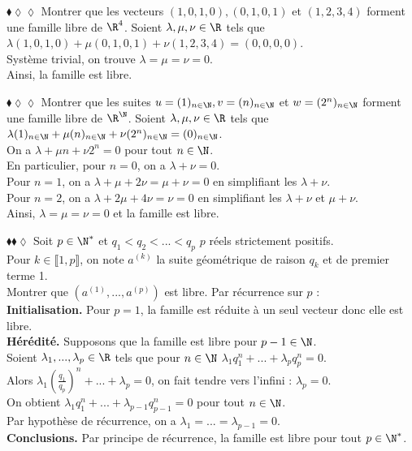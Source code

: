 \documentclass[11pt]{article}
\begin{document}
\begin{exercice}{$\blacklozenge\lozenge\lozenge$}{}
    Montrer que les vecteurs $(1, 0, 1, 0), (0, 1, 0, 1)$ et $(1, 2, 3, 4)$ forment une famille libre de $\R^4$.
    \tcblower
    Soient $\lambda, \mu, \nu \in \R$ tels que $\lambda(1, 0, 1, 0) + \mu(0, 1, 0, 1) + \nu(1, 2, 3, 4) = (0, 0, 0, 0)$.\\
    Système trivial, on trouve $\lambda = \mu = \nu = 0$.\\
    Ainsi, la famille est libre.
\end{exercice}

\begin{exercice}{$\blacklozenge\lozenge\lozenge$}{}
    Montrer que les suites $u=(1)_{n\in\N}, v=(n)_{n\in\N}$ et $w=(2^n)_{n\in\N}$ forment une famille libre de $\R^\N$.
    \tcblower
    Soient $\lambda, \mu, \nu \in \R$ tels que $\lambda(1)_{n\in\N} + \mu(n)_{n\in\N} + \nu(2^n)_{n\in\N} = (0)_{n\in\N}$.\\
    On a $\lambda + \mu n + \nu 2^n = 0$ pour tout $n \in \N$.\\
    En particulier, pour $n = 0$, on a $\lambda + \nu = 0$.\\
    Pour $n = 1$, on a $\lambda + \mu + 2\nu = \mu + \nu = 0$ en simplifiant les $\lambda + \nu$.\\
    Pour $n = 2$, on a $\lambda + 2\mu + 4\nu = \nu = 0$ en simplifiant les $\lambda + \nu$ et $\mu + \nu$.\\
    Ainsi, $\lambda = \mu = \nu = 0$ et la famille est libre.
\end{exercice}

\begin{exercice}{$\blacklozenge\blacklozenge\lozenge$}{}
    Soit $p\in\N^*$ et $q_1<q_2<...<q_p$ $p$ réels strictement positifs.\\
    Pour $k \in \llbracket 1, p \rrbracket$, on note $a^{(k)}$ la suite géométrique de raison $q_k$ et de premier terme 1.\\
    Montrer que $(a^{(1)}, ..., a^{(p)})$ est libre.
    \tcblower
    Par récurrence sur $p$ :\\
    \textbf{Initialisation.} Pour $p = 1$, la famille est réduite à un seul vecteur donc elle est libre.\\
    \textbf{Hérédité.} Supposons que la famille est libre pour $p-1 \in \N$.\\
    Soient $\lambda_1, ..., \lambda_{p} \in \R$ tels que pour $n\in\N$ $\lambda_1q_1^n + ... + \lambda_{p}q_{p}^n = 0$.\\
    Alors $\lambda_1\left(\frac{q_1}{q_{p}}\right)^n + ... + \lambda_p = 0$, on fait tendre vers l'infini : $\lambda_p = 0$.\\
    On obtient $\lambda_1q_1^n + ... + \lambda_{p-1}q_{p-1}^n = 0$ pour tout $n\in\N$.\\
    Par hypothèse de récurrence, on a $\lambda_1 = ... = \lambda_{p-1} = 0$.\\
    \textbf{Conclusions.} Par principe de récurrence, la famille est libre pour tout $p\in\N^*$.
\end{exercice}
\end{document}
